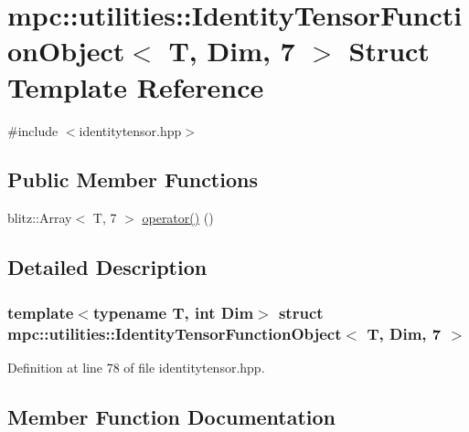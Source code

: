 \hypertarget{structmpc_1_1utilities_1_1_identity_tensor_function_object_3_01_t_00_01_dim_00_017_01_4}{}\section{mpc\+:\+:utilities\+:\+:Identity\+Tensor\+Function\+Object$<$ T, Dim, 7 $>$ Struct Template Reference}
\label{structmpc_1_1utilities_1_1_identity_tensor_function_object_3_01_t_00_01_dim_00_017_01_4}


{\ttfamily \#include $<$identitytensor.\+hpp$>$}

\subsection*{Public Member Functions}
\begin{DoxyCompactItemize}
\item 
blitz\+::\+Array$<$ T, 7 $>$ \mbox{\hyperlink{structmpc_1_1utilities_1_1_identity_tensor_function_object_3_01_t_00_01_dim_00_017_01_4_a8abd9d0314c43d562bd3922acb7dd553}{operator()}} ()
\end{DoxyCompactItemize}


\subsection{Detailed Description}
\subsubsection*{template$<$typename T, int Dim$>$\newline
struct mpc\+::utilities\+::\+Identity\+Tensor\+Function\+Object$<$ T, Dim, 7 $>$}



Definition at line 78 of file identitytensor.\+hpp.



\subsection{Member Function Documentation}
\mbox{\label{structmpc_1_1utilities_1_1_identity_tensor_function_object_3_01_t_00_01_dim_00_017_01_4_a8abd9d0314c43d562bd3922acb7dd553}} 
